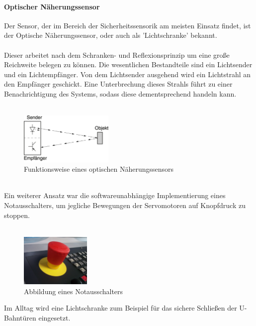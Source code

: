 \documentclass[11pt, a4paper]{article}
\begin{document}
\paragraph{Optischer N\"aherungssensor}
Der Sensor, der im Bereich der Sicherheitssensorik am meisten Einsatz findet, ist der Optische N\"aherungssensor, oder auch als 'Lichtschranke' bekannt. \\ \\
Dieser arbeitet nach dem Schranken- und Reflexionsprinzip um eine gro\ss{}e Reichweite belegen zu k\"onnen. Die wesentlichen Bestandteile sind ein Lichtsender und ein Lichtempf\"anger. Von dem Lichtsender ausgehend wird ein Lichtstrahl an den Empf\"anger geschickt. Eine Unterbrechung dieses Strahls f\"uhrt zu einer Benachrichtigung des Systems, sodass diese dementsprechend handeln kann.\\ \\
\begin{figure}[h!]
		\centering
		\includegraphics[width=0.4\textwidth]{graphics/sensors/optischer-naeherungssensor}
		\caption{Funktionsweise eines optischen N\"aherungssensors \cite{opt-sensor}}
\end{figure} \\
\noindent Ein weiterer Ansatz war die softwareunabh\"angige Implementierung eines Notausschalters, um jegliche Bewegungen der Servomotoren auf Knopfdruck zu stoppen. \\ \\
\begin{figure}[h!]
		\centering
		\includegraphics[width=0.3\textwidth]{graphics/sensors/notaus}
		\caption{Abbildung eines Notausschalters\cite{notaus-schalter}}
\end{figure}
\newpage
Im Alltag wird eine Lichtschranke zum Beispiel f\"ur das sichere Schlie\ss{}en der U-Bahnt\"uren eingesetzt.
\end{document}
